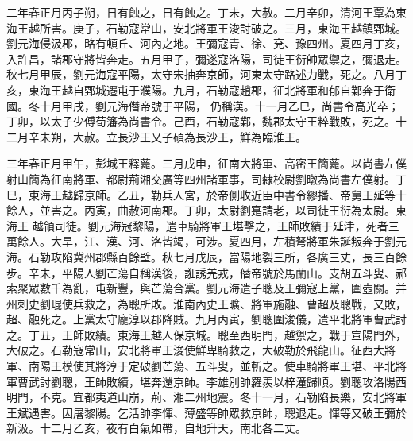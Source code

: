 \begin{pinyinscope}
 二年春正月丙子朔，日有蝕之，日有蝕之。丁未，大赦。二月辛卯，清河王覃為東海王越所害。庚子，石勒寇常山，安北將軍王浚討破之。三月，東海王越鎮鄄城。劉元海侵汲郡，略有頓丘、河內之地。王彌寇青、徐、兗、豫四州。夏四月丁亥，入許昌，諸郡守將皆奔走。五月甲子，彌遂寇洛陽，司徒王衍帥眾禦之，彌退走。秋七月甲辰，劉元海寇平陽，太守宋抽奔京師，河東太守路述力戰，死之。八月丁亥，東海王越自鄄城遷屯于濮陽。九月，石勒寇趙郡，征北將軍和郁自鄴奔于衛國。冬十月甲戌，劉元海僭帝號于平陽，
 仍稱漢。十一月乙巳，尚書令高光卒；丁卯，以太子少傅荀籓為尚書令。己酉，石勒寇鄴，魏郡太守王粹戰敗，死之。十二月辛未朔，大赦。立長沙王乂子碩為長沙王，鮮為臨淮王。



 三年春正月甲午，彭城王釋薨。三月戊申，征南大將軍、高密王簡薨。以尚書左僕射山簡為征南將軍、都尉荊湘交廣等四州諸軍事，司隸校尉劉暾為尚書左僕射。丁巳，東海王越歸京師。乙丑，勒兵人宮，於帝側收近臣中書令繆播、帝舅王延等十餘人，並害之。丙寅，曲赦河南郡。丁卯，太尉劉寔請老，以司徒王衍為太尉。東海王
 越領司徒。劉元海冠黎陽，遣車騎將軍王堪擊之，王師敗績于延津，死者三萬餘人。大旱，江、漢、河、洛皆竭，可涉。夏四月，左積弩將軍朱誕叛奔于劉元海。石勒攻陷冀州郡縣百餘壁。秋七月戊辰，當陽地裂三所，各廣三丈，長三百餘步。辛未，平陽人劉芒蕩自稱漢後，誑誘羌戎，僭帝號於馬蘭山。支胡五斗叟、郝索聚眾數千為亂，屯新豐，與芒蕩合黨。劉元海遣子聰及王彌寇上黨，圍壺關。并州刺史劉琨使兵救之，為聰所敗。淮南內史王曠、將軍施融、曹超及聰戰，又敗，超、融死之。上黨太守龐淳以郡降賊。九月丙寅，劉聰圍浚儀，遣平北將軍曹武討
 之。丁丑，王師敗績。東海王越人保京城。聰至西明門，越禦之，戰于宣陽門外，大破之。石勒寇常山，安北將軍王浚使鮮卑騎救之，大破勒於飛龍山。征西大將軍、南陽王模使其將淳于定破劉芒蕩、五斗叟，並斬之。使車騎將軍王堪、平北將軍曹武討劉聰，王師敗績，堪奔還京師。李雄別帥羅羨以梓潼歸順。劉聰攻洛陽西明門，不克。宜都夷道山崩，荊、湘二州地震。冬十一月，石勒陷長樂，安北將軍王斌遇害。因屠黎陽。乞活帥李惲、薄盛等帥眾救京師，聰退走。惲等又破王彌於新汲。十二月乙亥，夜有白氣如帶，自地升天，南北各二丈。




\end{pinyinscope}
